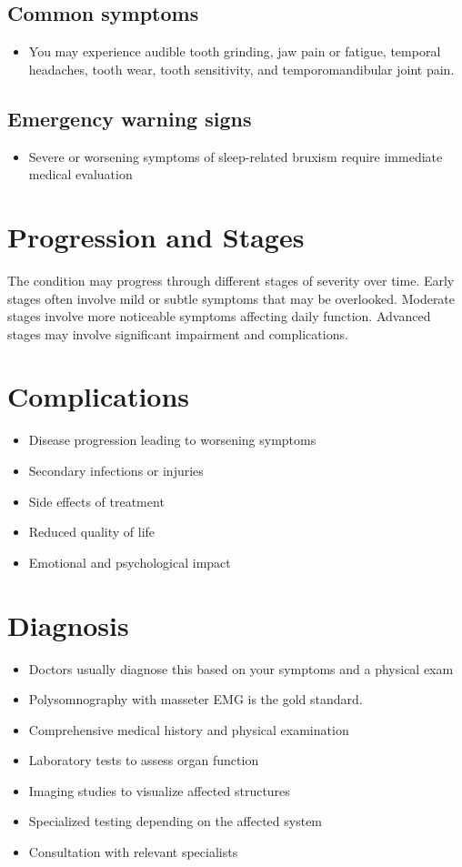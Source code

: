 \subsection{Common symptoms}
\begin{itemize}[noitemsep]
  \item You may experience audible tooth grinding, jaw pain or fatigue, temporal headaches, tooth wear, tooth sensitivity, and temporomandibular joint pain. 
  \end{itemize}

\subsection{Emergency warning signs}
\begin{itemize}[noitemsep]
  \item Severe or worsening symptoms of sleep-related bruxism require immediate medical evaluation
\end{itemize}
\section{Progression and Stages}
The condition may progress through different stages of severity over time. Early stages often involve mild or subtle symptoms that may be overlooked. Moderate stages involve more noticeable symptoms affecting daily function. Advanced stages may involve significant impairment and complications.
\section{Complications}
\begin{itemize}[noitemsep]
  \item Disease progression leading to worsening symptoms
  \item Secondary infections or injuries
  \item Side effects of treatment
  \item Reduced quality of life
  \item Emotional and psychological impact
\end{itemize}
\section{Diagnosis}
\begin{itemize}[noitemsep]
  \item Doctors usually diagnose this based on your symptoms and a physical exam
  \item Polysomnography with masseter EMG is the gold standard.
  \item Comprehensive medical history and physical examination
  \item Laboratory tests to assess organ function
  \item Imaging studies to visualize affected structures
  \item Specialized testing depending on the affected system
  \item Consultation with relevant specialists
\end{itemize}
